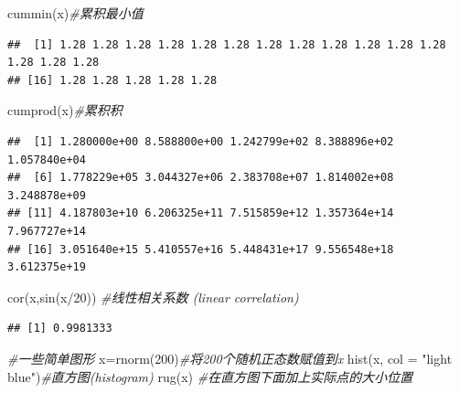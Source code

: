 \documentclass[
]{book}
\newenvironment{Shaded}{\begin{snugshade}}{\end{snugshade}}
\newcommand{\AttributeTok}[1]{\textcolor[rgb]{0.77,0.63,0.00}{#1}}
\newcommand{\CommentTok}[1]{\textcolor[rgb]{0.56,0.35,0.01}{\textit{#1}}}
\newcommand{\DecValTok}[1]{\textcolor[rgb]{0.00,0.00,0.81}{#1}}
\newcommand{\FunctionTok}[1]{\textcolor[rgb]{0.00,0.00,0.00}{#1}}
\newcommand{\NormalTok}[1]{#1}
\newcommand{\OtherTok}[1]{\textcolor[rgb]{0.56,0.35,0.01}{#1}}
\newcommand{\SpecialCharTok}[1]{\textcolor[rgb]{0.00,0.00,0.00}{#1}}
\newcommand{\StringTok}[1]{\textcolor[rgb]{0.31,0.60,0.02}{#1}}
\begin{document}
\begin{Shaded}
\begin{Highlighting}[]
\FunctionTok{cummin}\NormalTok{(x)}\CommentTok{\#累积最小值}
\end{Highlighting}
\end{Shaded}

\begin{verbatim}
##  [1] 1.28 1.28 1.28 1.28 1.28 1.28 1.28 1.28 1.28 1.28 1.28 1.28 1.28 1.28 1.28
## [16] 1.28 1.28 1.28 1.28 1.28
\end{verbatim}

\begin{Shaded}
\begin{Highlighting}[]
\FunctionTok{cumprod}\NormalTok{(x)}\CommentTok{\#累积积}
\end{Highlighting}
\end{Shaded}

\begin{verbatim}
##  [1] 1.280000e+00 8.588800e+00 1.242799e+02 8.388896e+02 1.057840e+04
##  [6] 1.778229e+05 3.044327e+06 2.383708e+07 1.814002e+08 3.248878e+09
## [11] 4.187803e+10 6.206325e+11 7.515859e+12 1.357364e+14 7.967727e+14
## [16] 3.051640e+15 5.410557e+16 5.448431e+17 9.556548e+18 3.612375e+19
\end{verbatim}

\begin{Shaded}
\begin{Highlighting}[]
\FunctionTok{cor}\NormalTok{(x,}\FunctionTok{sin}\NormalTok{(x}\SpecialCharTok{/}\DecValTok{20}\NormalTok{)) }\CommentTok{\#线性相关系数 (linear correlation)}
\end{Highlighting}
\end{Shaded}

\begin{verbatim}
## [1] 0.9981333
\end{verbatim}

\begin{Shaded}
\begin{Highlighting}[]
\CommentTok{\#一些简单图形}
\NormalTok{x}\OtherTok{=}\FunctionTok{rnorm}\NormalTok{(}\DecValTok{200}\NormalTok{)}\CommentTok{\#将200个随机正态数赋值到x}
\FunctionTok{hist}\NormalTok{(x, }\AttributeTok{col =} \StringTok{"light blue"}\NormalTok{)}\CommentTok{\#直方图(histogram)}
\FunctionTok{rug}\NormalTok{(x) }\CommentTok{\#在直方图下面加上实际点的大小位置}
\end{Highlighting}
\end{Shaded}
\end{document}

